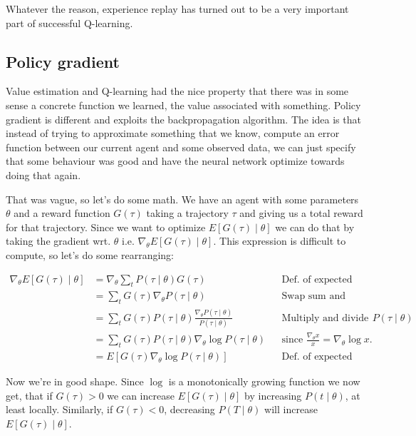 \documentclass{article}
\theoremstyle{changedot}
\theoremstyle{changedotbreak}
\theoremstyle{nonumberplain}
\begin{document}
Whatever the reason, experience replay has turned out to be a very important part of successful Q-learning.

\subsection{Policy gradient}
Value estimation and Q-learning had the nice property that there was in some sense a concrete function we learned, the value associated with something. Policy gradient is different and exploits the backpropagation algorithm. The idea is that instead of trying to approximate something that we know, compute an error function between our current agent and some observed data, we can just specify that some behaviour was good and have the neural network optimize towards doing that again.

That was vague, so let's do some math. We have an agent with some parameters $\theta$ and a reward function $G(\tau)$ taking a trajectory $\tau$ and giving us a total reward for that trajectory. Since we want to optimize $E[G(\tau) \mid \theta]$ we can do that by taking the gradient wrt. $\theta$ i.e. $\nabla_{\theta} E[G(\tau) \mid \theta]$. This expression is difficult to compute, so let's do some rearranging:

\begin{equation} \label{policy_grad}
\begin{aligned}
  \nabla_{\theta} E[G(\tau) \mid \theta] &= \nabla_{\theta} \sum_{t}P(\tau \mid \theta) G(\tau) && \text{Def. of expected value}\\
                                     &= \sum_{t} G(\tau) \nabla_{\theta} P(\tau \mid \theta) && \text{Swap sum and gradient, rearrange} \\
                                      &= \sum_{t} G(\tau) P(\tau \mid \theta) \frac{\nabla_{\theta} P(\tau \mid \theta)}{P(\tau \mid \theta)} && \text{Multiply and divide by $P(\tau \mid \theta)$} \\
                                      &= \sum_{t} G(\tau) P(\tau \mid \theta) \nabla_{\theta} \log P(\tau \mid \theta) && \text{since $\frac{\nabla_{\theta} x}{x} = \nabla_{\theta} \log x$.} \\
                                      &= E[G(\tau) \nabla_{\theta} \log P(\tau \mid \theta)] && \text{Def. of expected value}
\end{aligned}
\end{equation}

Now we're in good shape. Since $\log$ is a monotonically growing function we now get, that if $G(\tau) > 0$ we can increase $E[G(\tau) \mid \theta]$ by increasing $P(t \mid \theta)$, at least locally. Similarly, if $G(\tau) < 0$, decreasing $P(T \mid \theta)$ will increase $E[G(\tau) \mid \theta]$.
\end{document}
